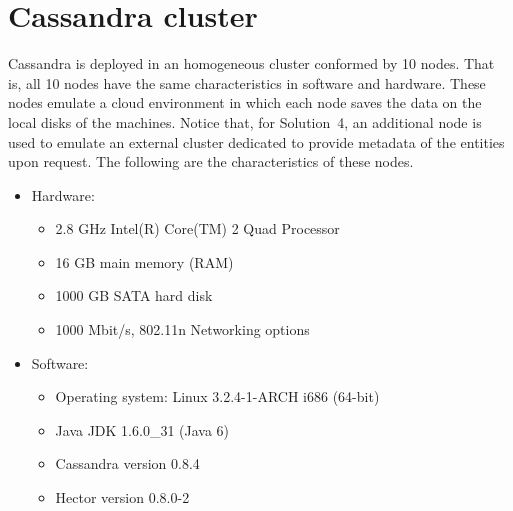 % 	
% 			
% 			


\section{Cassandra cluster} \label{sexp:CassandraCluster}
Cassandra is deployed in an homogeneous cluster conformed by 10 nodes. That is,
 all 10 nodes have the same characteristics in software and hardware. These
 nodes emulate a cloud environment in which each node saves
 the data on the local disks of the machines. Notice that, for Solution~4,  an
 additional node is used to emulate an external cluster dedicated to provide
 metadata of the entities upon request.
 The following are the characteristics of these nodes.


\begin{itemize}
  \item Hardware:
  	\begin{itemize}
  	  \item 2.8 GHz Intel(R) Core(TM) 2 Quad Processor %
  	  \item 16 GB main memory (RAM)%
  	  \item 1000 GB SATA hard disk %
  	  \item 1000 Mbit/s, 802.11n Networking options
  	 \end{itemize}
  \item Software: 
  \begin{itemize}
    \item Operating system: Linux 3.2.4-1-ARCH i686 (64-bit)
    \item Java JDK 1.6.0\_31 (Java 6)
    \item Cassandra version 0.8.4 
    \item Hector version 0.8.0-2
  \end{itemize}
\end{itemize}


